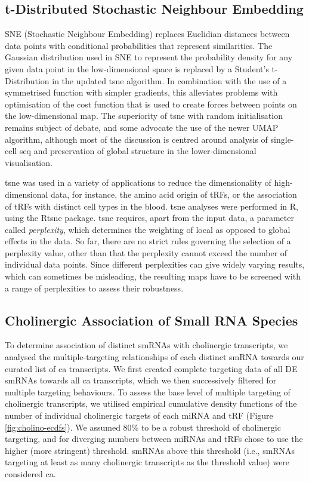\begin{method}
\subsection{t-Distributed Stochastic Neighbour Embedding} \label{sec:stroke:tsne}
SNE (Stochastic Neighbour Embedding) replaces Euclidian distances between data points with conditional probabilities that represent similarities. The Gaussian distribution used in SNE to represent the probability density for any given data point in the low-dimensional space is replaced by a Student's t-Distribution in the updated \ac{tsne} algorithm. In combination with the use of a symmetrised function with simpler gradients, this alleviates problems with optimisation of the cost function that is used to create forces between points on the low-dimensional map.\cite{Maaten2008} The superiority of \ac{tsne} with random initialisation remains subject of debate, and some advocate the use of the newer UMAP algorithm\cite{McInnes2018}, although most of the discussion is centred around analysis of single-cell \ac{seq} and preservation of global structure in the lower-dimensional visualisation.\cite{Becht2019}

\ac{tsne} was used in a variety of applications to reduce the dimensionality of high-dimensional data, for instance, the amino acid origin of tRFs, or the association of tRFs with distinct cell types in the blood. \ac{tsne} analyses were performed in R, using the Rtsne package.\cite{Krijthe2015} \ac{tsne} requires, apart from the input data, a parameter called \emph{perplexity}, which determines the weighting of local as opposed to global effects in the data. So far, there are no strict rules governing the selection of a perplexity value, other than that the perplexity cannot exceed the number of individual data points. Since different perplexities can give widely varying results, which can sometimes be misleading, the resulting maps have to be screened with a range of perplexities to assess their robustness.

\subsection{Cholinergic Association of Small RNA Species} \label{sec:stroke:chol-assoc}
To determine association of distinct smRNAs with cholinergic transcripts, we analysed the multiple-targeting relationships of each distinct smRNA towards our curated list of \ac{ca} transcripts. We first created complete targeting data of all DE smRNAs towards all \ac{ca} transcripts, which we then successively filtered for multiple targeting behaviours. To assess the base level of multiple targeting of cholinergic transcripts, we utilised empirical cumulative density functions of the number of individual cholinergic targets of each miRNA and tRF (Figure \ref{fig:cholino-ecdfs}). We assumed 80\% to be a robust threshold of cholinergic targeting, and for diverging numbers between miRNAs and tRFs chose to use the higher (more stringent) threshold. smRNAs above this threshold (i.e., smRNAs targeting at least as many cholinergic transcripts as the threshold value) were considered \ac{ca}.

\end{method}

